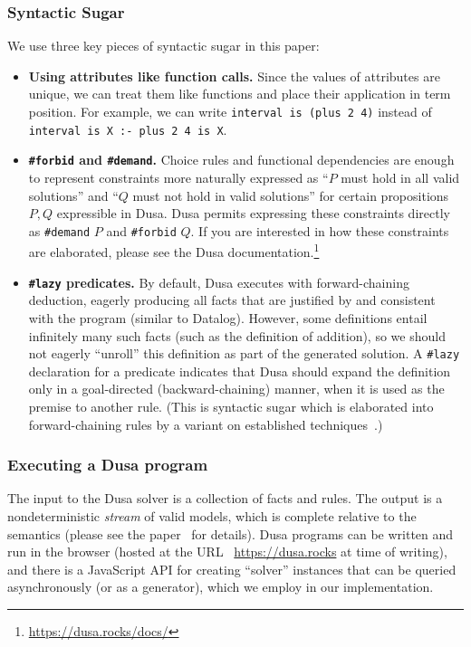 \subsubsection{Syntactic Sugar}

We use three key pieces of syntactic sugar in this paper:
\begin{itemize}
  \item {\bf Using attributes like function calls.} Since
    the values of attributes are unique, we can treat them
    like functions and place their application in term
    position. For example, we can write
    \verb|interval is (plus 2 4)| instead of
    \verb|interval is X :- plus 2 4 is X|.
  \item {\bf \verb|#forbid| and \verb|#demand|.} Choice rules and
    functional dependencies are enough to represent
    constraints more naturally expressed as ``$P$ must hold in
    all valid solutions''
    and ``$Q$ must not hold in valid solutions'' for certain propositions $P,Q$
    expressible in Dusa. Dusa permits expressing these
    constraints directly as \verb|#demand| $P$ and
    \verb|#forbid| $Q$. If you are interested in how these
    constraints are elaborated, please see the Dusa documentation.\footnote{\url{https://dusa.rocks/docs/}}
  \item {\bf \verb|#lazy| predicates.} By default, Dusa executes with
    forward-chaining deduction, eagerly producing all facts that are
    justified by and consistent with the program (similar to Datalog).
    However, some definitions entail infinitely many such facts (such
    as the definition of addition), so we should not eagerly ``unroll''
    this definition as part of the generated solution.
    A \verb|#lazy| declaration for a predicate indicates that Dusa should
    expand the definition only in a goal-directed (backward-chaining)
    manner, when it is used as the premise to another rule. (This is
    syntactic sugar which is elaborated into forward-chaining
    rules by a variant on established
    techniques~\cite{bancilhon1985magic,beeri1987power,tekle2010precise}.)
\end{itemize}

\subsubsection{Executing a Dusa program}

The input to the Dusa solver is a collection of facts and
rules. The output is a nondeterministic {\em stream} of
valid models, which is complete relative to the semantics
(please see the paper~\cite{martens2025finite} for details).
Dusa programs can be written and run in the browser (hosted at the URL
~\url{https://dusa.rocks} at time of writing), and there
is a JavaScript API for creating ``solver'' instances
that can be queried asynchronously (or as a generator), which
we employ in our implementation.

